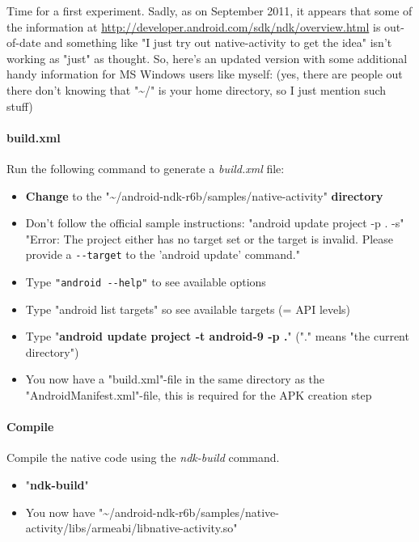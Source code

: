 Time for a first experiment. Sadly, as on September 2011, it appears that some of the information at \url{http://developer.android.com/sdk/ndk/overview.html} is out-of-date and something like "I just try out native-activity to get the idea" isn't working as "just" as thought. So, here's an updated version with some additional handy information for MS Windows users like myself: (yes, there are people out there don't knowing that "\textasciitilde /" is your home directory, so I just mention such stuff)


\paragraph{build.xml}
Run the following command to generate a \emph{build.xml} file:
\begin{itemize}
\item{\textbf{Change} to the "\textasciitilde /android-ndk-r6b/samples/native-activity" \textbf{directory}}
\item{\textrightarrow{} Don't follow the official sample instructions: "android update project -p . -s" \textrightarrow{} "Error: The project either has no target set or the target is invalid. Please provide a \verb+--target+ to the 'android update' command."}
\item{\textrightarrow{} Type \verb+"android --help"+ to see available options}
\item{\textrightarrow{} Type "android list targets" so see available targets (= \ac{API} levels)}
\item{Type "\textbf{android update project -t android-9 -p .}" ("." means "the current directory")}
\item{\textrightarrow{} You now have a "build.xml"-file in the same directory as the "AndroidManifest.xml"-file, this is required for the \ac{APK} creation step}
\end{itemize}


\paragraph{Compile}
Compile the native code using the \emph{ndk-build} command.
\begin{itemize}
\item{"\textbf{ndk-build}"}
\item{\textrightarrow{} You now have "\textasciitilde /android-ndk-r6b/samples/native-activity/libs/armeabi/libnative-activity.so"}
\end{itemize}


